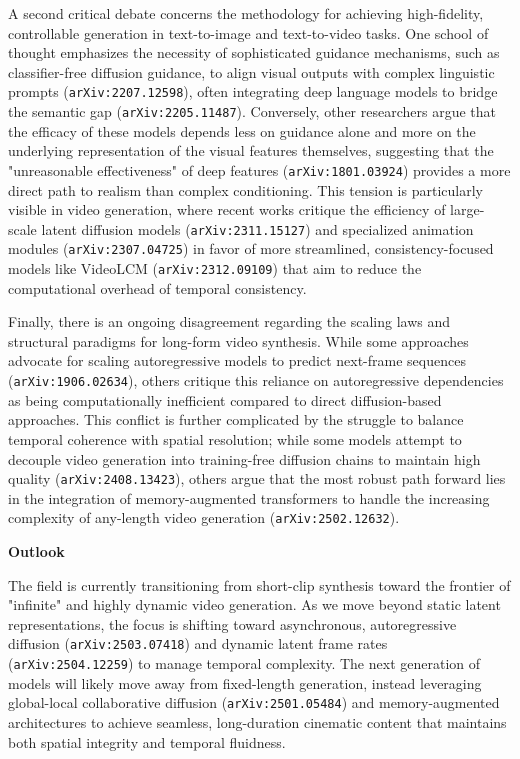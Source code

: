 \documentclass[11pt]{article}
\begin{document}
A second critical debate concerns the methodology for achieving high-fidelity, controllable generation in text-to-image and text-to-video tasks. One school of thought emphasizes the necessity of sophisticated guidance mechanisms, such as classifier-free diffusion guidance, to align visual outputs with complex linguistic prompts (\texttt{arXiv:2207.12598}), often integrating deep language models to bridge the semantic gap (\texttt{arXiv:2205.11487}). Conversely, other researchers argue that the efficacy of these models depends less on guidance alone and more on the underlying representation of the visual features themselves, suggesting that the "unreasonable effectiveness" of deep features (\texttt{arXiv:1801.03924}) provides a more direct path to realism than complex conditioning. This tension is particularly visible in video generation, where recent works critique the efficiency of large-scale latent diffusion models (\texttt{arXiv:2311.15127}) and specialized animation modules (\texttt{arXiv:2307.04725}) in favor of more streamlined, consistency-focused models like VideoLCM (\texttt{arXiv:2312.09109}) that aim to reduce the computational overhead of temporal consistency.

Finally, there is an ongoing disagreement regarding the scaling laws and structural paradigms for long-form video synthesis. While some approaches advocate for scaling autoregressive models to predict next-frame sequences (\texttt{arXiv:1906.02634}), others critique this reliance on autoregressive dependencies as being computationally inefficient compared to direct diffusion-based approaches. This conflict is further complicated by the struggle to balance temporal coherence with spatial resolution; while some models attempt to decouple video generation into training-free diffusion chains to maintain high quality (\texttt{arXiv:2408.13423}), others argue that the most robust path forward lies in the integration of memory-augmented transformers to handle the increasing complexity of any-length video generation (\texttt{arXiv:2502.12632}).

\textbf{Outlook}

The field is currently transitioning from short-clip synthesis toward the frontier of "infinite" and highly dynamic video generation. As we move beyond static latent representations, the focus is shifting toward asynchronous, autoregressive diffusion (\texttt{arXiv:2503.07418}) and dynamic latent frame rates (\texttt{arXiv:2504.12259}) to manage temporal complexity. The next generation of models will likely move away from fixed-length generation, instead leveraging global-local collaborative diffusion (\texttt{arXiv:2501.05484}) and memory-augmented architectures to achieve seamless, long-duration cinematic content that maintains both spatial integrity and temporal fluidness.
\end{document}
